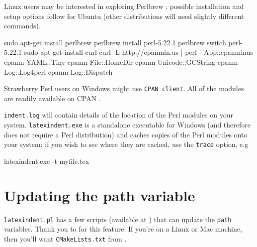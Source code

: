 		Linux users may be interested in exploring Perlbrew \cite{perlbrew}; possible installation and setup
		options follow for Ubuntu (other distributions will need slightly different commands).
		\begin{commandshell}
sudo apt-get install perlbrew
perlbrew install perl-5.22.1
perlbrew switch perl-5.22.1
sudo apt-get install curl
curl -L http://cpanmin.us | perl - App::cpanminus
cpanm YAML::Tiny
cpanm File::HomeDir
cpanm Unicode::GCString
cpanm Log::Log4perl
cpanm Log::Dispatch
\end{commandshell}

		Strawberry Perl users on Windows might use
		\texttt{CPAN client}. All of the modules are readily available on CPAN \cite{cpan}.

		\texttt{indent.log} will contain details of the location
		of the Perl modules on your system.  \texttt{latexindent.exe} is a standalone
		executable for Windows (and therefore does not require a Perl distribution) and caches copies of the Perl modules onto your system; if you
		wish to see where they are cached, use the  \texttt{trace} option, e.g
		\begin{dosprompt}
latexindent.exe -t myfile.tex
 \end{dosprompt}

	\section{Updating the path variable}\label{sec:updating-path}
	 \texttt{latexindent.pl} has a few scripts (available at \cite{latexindent-home}) that can update the \texttt{path} variables.
	 Thank you to \cite{jasjuang} for this feature. If you're
	 on a Linux or Mac machine, then you'll want \texttt{CMakeLists.txt} from \cite{latexindent-home}.
